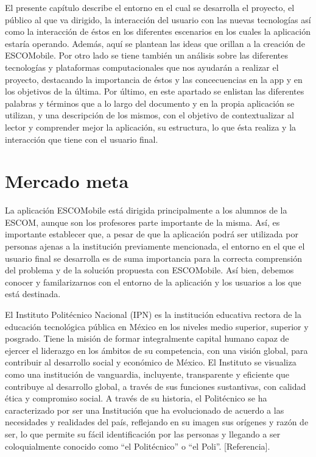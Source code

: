 \noindent
El presente capítulo describe el entorno en el cual se desarrolla el proyecto, el público al que va dirigido, la interacción del usuario con las nuevas tecnologías así como la interacción de éstos en los diferentes escenarios en los cuales la aplicación estaría operando. Además, aquí se plantean las ideas que orillan a la creación de ESCOMobile. Por otro lado se tiene también un análisis sobre las diferentes tecnologías y plataformas computacionales que nos ayudarán a realizar el proyecto, destacando la importancia de éstos y las concecuencias en la app y en los objetivos de la última. Por último, en este apartado se enlistan las diferentes palabras y términos que a lo largo del documento y en la propia aplicación se utilizan, y una descripción de los mismos, con el objetivo de contextualizar al lector y comprender mejor la aplicación, su estructura, lo que ésta realiza y la interacción que tiene con el usuario final.

\section{Mercado meta}

\noindent
La aplicación ESCOMobile está dirigida principalmente a los alumnos de la ESCOM, aunque son los profesores parte importante de la misma. Así, es importante establecer que, a pesar de que la aplicación podrá ser utilizada por personas ajenas a la institución previamente mencionada, el entorno en el que el usuario final se desarrolla es de suma importancia para la correcta comprensión del problema y de la solución propuesta con ESCOMobile. Así bien, debemos conocer y familarizarnos con el entorno de la aplicación y los usuarios a los que está destinada. 

\noindent
El Instituto Politécnico Nacional (IPN) es la institución educativa rectora de la educación tecnológica pública en México en los niveles medio superior, superior y posgrado. Tiene la misión de formar integralmente capital humano capaz de ejercer el liderazgo en los ámbitos de su competencia, con una visión global, para contribuir al desarrollo social y económico de México. 
El Instituto se visualiza como una institución de vanguardia, incluyente, transparente y eficiente que contribuye al desarrollo global, a través de sus funciones sustantivas, con calidad ética y compromiso social. 
A través de su historia, el Politécnico se ha caracterizado por ser una Institución que ha evolucionado de acuerdo a las necesidades y realidades del país, reflejando en su imagen sus orígenes y razón de ser, lo que permite su fácil identificación por las personas y llegando a ser coloquialmente conocido como “el Politécnico” o “el Poli”. [Referencia].

